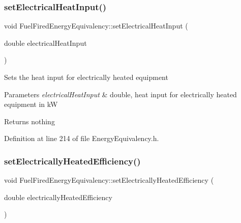 \subsubsection{\texorpdfstring{set\+Electrical\+Heat\+Input()}{setElectricalHeatInput()}\hspace{0.1cm}{\footnotesize\ttfamily [3/3]}}
{\footnotesize\ttfamily void Fuel\+Fired\+Energy\+Equivalency\+::set\+Electrical\+Heat\+Input (\begin{DoxyParamCaption}\item[{double}]{electrical\+Heat\+Input }\end{DoxyParamCaption})\hspace{0.3cm}{\ttfamily [inline]}}

Sets the heat input for electrically heated equipment


\begin{DoxyParams}{Parameters}
{\em electrical\+Heat\+Input} & double, heat input for electrically heated equipment in kW\\
\hline
\end{DoxyParams}
\begin{DoxyReturn}{Returns}
nothing 
\end{DoxyReturn}


Definition at line 214 of file Energy\+Equivalency.\+h.

\mbox{\label{class_fuel_fired_energy_equivalency_a2e8e166d9824ee07805cd790eff5e361}} 
\subsubsection{\texorpdfstring{set\+Electrically\+Heated\+Efficiency()}{setElectricallyHeatedEfficiency()}\hspace{0.1cm}{\footnotesize\ttfamily [1/3]}}
{\footnotesize\ttfamily void Fuel\+Fired\+Energy\+Equivalency\+::set\+Electrically\+Heated\+Efficiency (\begin{DoxyParamCaption}\item[{double}]{electrically\+Heated\+Efficiency }\end{DoxyParamCaption})\hspace{0.3cm}{\ttfamily [inline]}}

